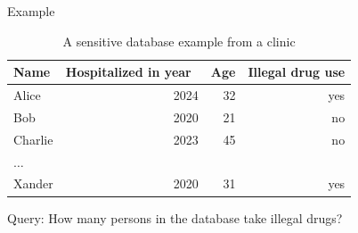 \documentclass[12pt,aspectratio=169,handout]{beamer}
\begin{document}
\begin{frame}{Example}

\begin{table}
\footnotesize
\begin{tabular}{lrrr} \toprule
Name & Hospitalized in year & Age & Illegal drug use \\ \midrule
Alice & 2024 & 32 & yes \\
Bob & 2020 & 21 & no \\
Charlie & 2023 & 45 & no \\
$\ldots$ & & & \\
Xander & 2020 & 31 & yes \\ \bottomrule
\end{tabular}
\caption{A sensitive database example from a clinic}
\end{table}

Query: How many persons in the database take illegal drugs?




\end{frame}
\end{document}
